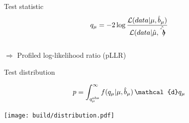 \documentclass[aspectratio=1610, 9pt]{beamer}
\begin{document}
\begin{frame}{Test statistic}
    \Large
    \centering
    \begin{align}
        q_\mu = -2 \log{\frac{\mathcal{L}(data\vert\mu,\hat{b}_\mu)}{\mathcal{L}(data\vert\hat{\mu},\hat{\hat{b})}}} \notag 
    \end{align}\\[3ex]
    $\Rightarrow$ Profiled log-likelihood ratio (pLLR)
\end{frame}

\begin{frame}{Test distribution}
    \begin{minipage}{0.49\textwidth}
        \Large
        \centering
        \begin{align}
            p = \int_{q_\mu^\text{obs}}^\infty f(q_\mu\vert \mu,\hat{b}_\mu)\,\mathcal{d}q_\mu \notag
        \end{align}
    \end{minipage}
    \hfill
    \begin{minipage}{0.5\textwidth}
        \texttt{[image: build/distribution.pdf]}
    \end{minipage}
\end{frame}
\end{document}

